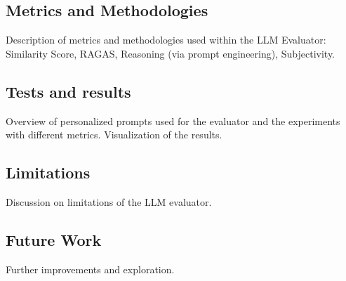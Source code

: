 \subsection{Metrics and Methodologies}
Description of metrics and methodologies used within the LLM Evaluator: Similarity Score, RAGAS, Reasoning (via prompt engineering), Subjectivity.

\subsection{Tests and results}
Overview of personalized prompts used for the evaluator and the experiments with different metrics. Visualization of the results.

\subsection{Limitations}
Discussion on limitations of the LLM evaluator.

\subsection{Future Work}
Further improvements and exploration.